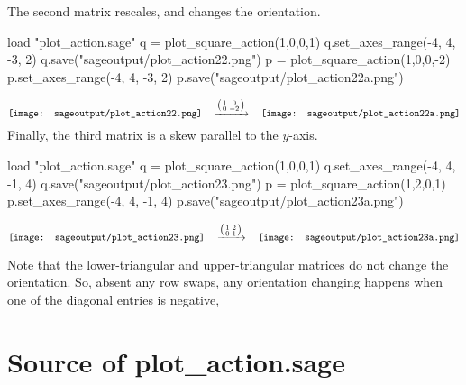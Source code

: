 \noindent
The second matrix rescales, and changes the orientation.
\begin{sageoutput}[d,0,4;d,5,7]
load "plot_action.sage"
q = plot_square_action(1,0,0,1) 
q.set_axes_range(-4, 4, -3, 2) 
q.save("sageoutput/plot_action22.png")
p = plot_square_action(1,0,0,-2) 
p.set_axes_range(-4, 4, -3, 2) 
p.save("sageoutput/plot_action22a.png")
\end{sageoutput}
\begin{equation*}
  \vcenteredhbox{\texttt{[image: sageoutput/plot\_action22.png]}}
  \quad\mapsvia{\big (\begin{smallmatrix} 1 &0 \\ 0 &-2 \end{smallmatrix}\big )}\quad
  \vcenteredhbox{\texttt{[image: sageoutput/plot\_action22a.png]}}
\end{equation*}
\noindent
Finally, the third matrix is a skew parallel to the $y$-axis.
\begin{sageoutput}[d,0,4;d,5,7]
load "plot_action.sage"
q = plot_square_action(1,0,0,1) 
q.set_axes_range(-4, 4, -1, 4) 
q.save("sageoutput/plot_action23.png")
p = plot_square_action(1,2,0,1) 
p.set_axes_range(-4, 4, -1, 4) 
p.save("sageoutput/plot_action23a.png")
\end{sageoutput}
\begin{equation*}
  \vcenteredhbox{\texttt{[image: sageoutput/plot\_action23.png]}}
  \quad\mapsvia{\big (\begin{smallmatrix} 1 &2 \\ 0 &1 \end{smallmatrix}\big )}\quad
  \vcenteredhbox{\texttt{[image: sageoutput/plot\_action23a.png]}}
\end{equation*}
  

Note that the lower-triangular and upper-triangular matrices do not
change the orientation.
So, absent any row swaps, 
any orientation changing happens when one of the diagonal entries is 
negative, 



\section{Source of plot\_action.sage}


\endinput


TODO:
